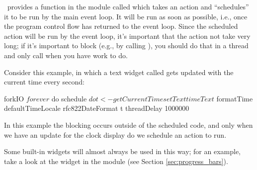 \vtyui\ provides a function in the  module called
 which takes an  action and ``schedules'' it to be
run by the main event loop.  It will be run as soon as possible, i.e.,
once the program control flow has returned to the event loop.  Since
the scheduled action will be run by the event loop, it's important
that the action not take very long; if it's important to block (e.g.,
by calling ), you should do that in
a thread and only call  when you have work to do.

Consider this example, in which a text widget called 
gets updated with the current time every second:

\begin{haskellcode}
 forkIO $
   forever $ do
     schedule $ do
       t <- getCurrentTime
       setText timeText $
         formatTime defaultTimeLocale rfc822DateFormat t
     threadDelay 1000000
\end{haskellcode}

In this example the blocking occurs outside of the scheduled code, and
only when we have an update for the clock display do we schedule an
action to run.

Some built-in widgets will almost always be used in this way; for an
example, take a look at the  widget in the
 module (see Section \ref{sec:progress_bars}).
